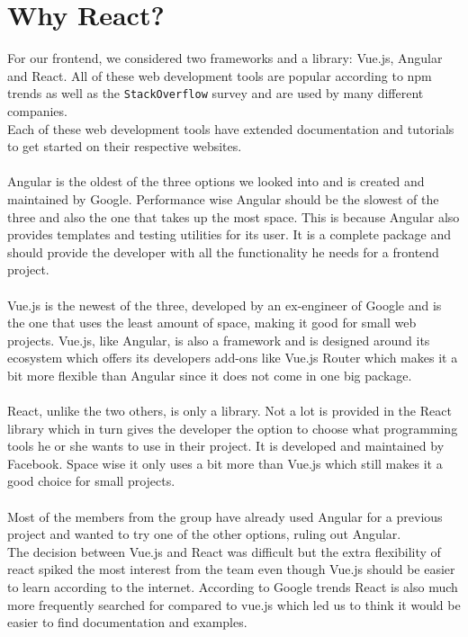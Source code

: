 \section{Why React?}
For our frontend, we considered two frameworks and a library: Vue.js, Angular and React.
All of these web development tools are popular according to npm trends as well as the \texttt{StackOverflow} survey and are used by many different companies\cite{VueReactAngular}.
\\
Each of these web development tools have extended documentation and tutorials to get started on their respective websites.
\\\\
Angular is the oldest of the three options we looked into and is created and maintained by Google\cite{AngularHistory}.
Performance wise Angular should be the slowest of the three and also the one that takes up the most space\cite{VueReactAngular}.
This is because Angular also provides templates and testing utilities for its user.
It is a complete package and should provide the developer with all the functionality he needs for a frontend project.
\\\\
Vue.js is the newest of the three, developed by an ex-engineer of Google and is the one that uses the least amount of space, making it good for small web projects\cite{ComparisonWithOtherFrameworks}.
Vue.js, like Angular, is also a framework and is designed around its ecosystem which offers its developers add-ons like Vue.js Router which makes it a bit more flexible than Angular since it does not come in one big package.
\\\\
React, unlike the two others, is only a library\cite{ReactJS}.
Not a lot is provided in the React library which in turn gives the developer the option to choose what programming tools he or she wants to use in their project.
It is developed and maintained by Facebook\cite{ReactHistory}.
Space wise it only uses a bit more than Vue.js which still makes it a good choice for small projects.
\\\\
Most of the members from the group have already used Angular for a previous project and wanted to try one of the other options, ruling out Angular. 
\\
The decision between Vue.js and React was difficult but the extra flexibility of react spiked the most interest from the team even though Vue.js should be easier to learn according to the internet\cite{ComparisonWithOtherFrameworks}.
According to Google trends React is also much more frequently searched for compared to vue.js which led us to think it would be easier to find documentation and examples.


